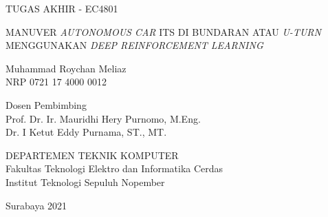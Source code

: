 TUGAS AKHIR - EC4801

\vspace{6ex}

\begin{large}
  MANUVER \textit{AUTONOMOUS CAR} ITS DI BUNDARAN ATAU \textit{U-TURN} MENGGUNAKAN \textit{DEEP REINFORCEMENT LEARNING}
\end{large}

\vspace{4ex}

Muhammad Roychan Meliaz\\
NRP 0721 17 4000 0012

\vspace{2ex}

Dosen Pembimbing \\
Prof. Dr. Ir. Mauridhi Hery Purnomo, M.Eng. \\
Dr. I Ketut Eddy Purnama, ST., MT.

\vspace{6ex}

DEPARTEMEN TEKNIK KOMPUTER \\
Fakultas Teknologi Elektro dan Informatika Cerdas\\
Institut Teknologi Sepuluh Nopember

Surabaya 2021
